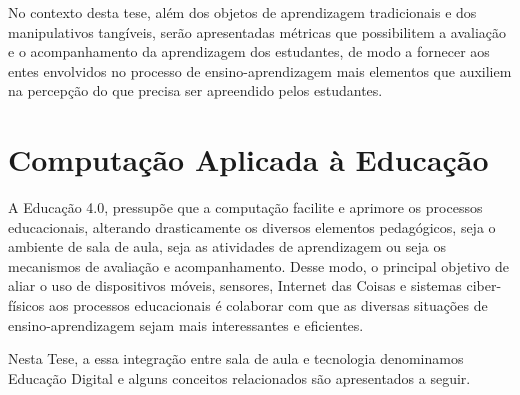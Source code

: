 No contexto desta tese, além dos objetos de aprendizagem tradicionais e dos manipulativos tangíveis, serão apresentadas métricas que possibilitem a avaliação e o acompanhamento da aprendizagem dos estudantes, de modo a fornecer aos entes envolvidos no processo de ensino-aprendizagem mais elementos que auxiliem na percepção do que precisa ser apreendido pelos estudantes.








\section{Computação Aplicada à Educação}\label{section:computacao_educacao}

A Educação 4.0, pressupõe que a computação facilite e aprimore os processos educacionais, alterando drasticamente os diversos elementos pedagógicos, seja o ambiente de sala de aula, seja as atividades de aprendizagem ou seja os mecanismos de avaliação e acompanhamento. Desse modo, o principal objetivo de aliar o uso de dispositivos móveis, sensores, Internet das Coisas e sistemas ciber-físicos aos processos educacionais é colaborar com que as diversas situações de  ensino-aprendizagem sejam mais interessantes e eficientes.

Nesta Tese, a essa integração entre sala de aula e tecnologia denominamos Educação Digital e alguns conceitos relacionados são apresentados a seguir.

